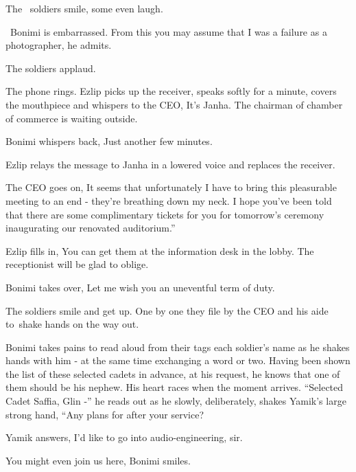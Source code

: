 \documentclass[letterpaper]{article}
\begin{document}
The \ soldiers smile, some even laugh\textcolor[rgb]{0.0,0.4392157,0.7529412}{.}

~Bonimi is embarrassed. {\textquotedbl}From this you may assume that I was a failure as a photographer,{\textquotedbl}
he admits. 

The soldiers applaud.~ 

The phone rings. Ezlip picks up the receiver, speaks softly for a minute, covers the mouthpiece and whispers to the CEO,
{\textquotedbl}It's Janha. The chairman of chamber of commerce is waiting outside.{\textquotedbl} 

Bonimi whispers back, {\textquotedbl}Just another few minutes.{\textquotedbl} 

Ezlip relays the message to Janha in a lowered voice and replaces the receiver.

The CEO goes on, {\textquotedbl}It seems that unfortunately I have to bring this pleasurable meeting to an end - they're
breathing down my neck. I hope you've been told that there are some complimentary tickets for you for
tomorrow's\textcolor[rgb]{0.0,0.4392157,0.7529412}{ }ceremony inaugurating our renovated auditorium.'' 

Ezlip fills in, {\textquotedbl}You can get them at the information desk in the lobby. The receptionist will be glad to
oblige.{\textquotedbl} 

Bonimi takes over, {\textquotedbl}Let me wish you an uneventful term of duty.{\textquotedbl}

The soldiers smile and get up. One by one they file by the CEO and his aide to~shake hands on the way out. 

Bonimi takes pains\textcolor[rgb]{0.0,0.4392157,0.7529412}{ }to read aloud\textcolor[rgb]{0.0,0.4392157,0.7529412}{
}from their tags each soldier's name as he shakes hands with him - at the same time exchanging a word or two. Having
been\textcolor[rgb]{0.0,0.4392157,0.7529412}{ }shown the list of these selected cadets in advance, at his request, he
knows that one of them should be his nephew. His heart races when the moment arrives. ``Selected Cadet Saffia, Glin -''
he reads out as he slowly, deliberately, shakes Yamik's large strong\textcolor[rgb]{0.0,0.4392157,0.7529412}{ }hand,
``Any plans for after your service?{\textquotedbl} 

Yamik answers, {\textquotedbl}I'd like to go into audio-engineering, sir.{\textquotedbl} 

{\textquotedbl}You might even join us here,{\textquotedbl} Bonimi smiles. 
\end{document}
